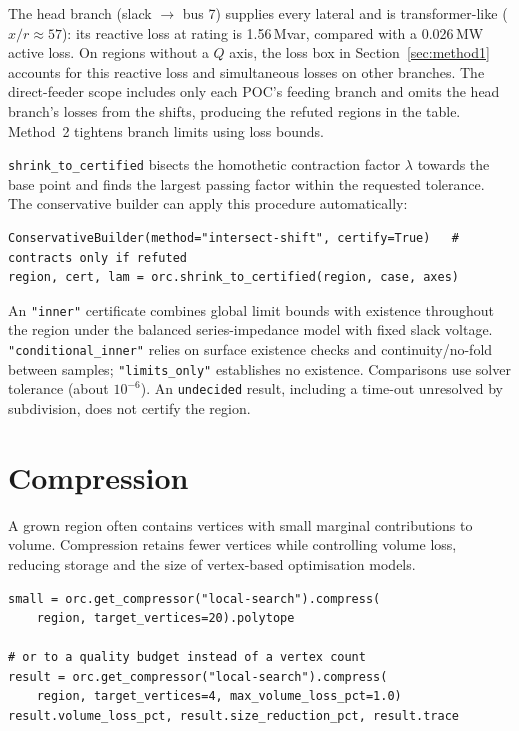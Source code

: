 \documentclass[11pt,a4paper]{report}
\newcommand{\why}[1]{\par\medskip\begingroup\noindent #1\par\endgroup\medskip}
\newcommand{\trap}[1]{\begin{warnbox}#1\end{warnbox}}
\newcommand{\code}[1]{\texttt{\small #1}}
\begin{document}
\why{The head branch (slack $\to$ bus 7) supplies every lateral and is
transformer-like ($x/r \approx 57$): its reactive loss at rating is
1.56\,Mvar, compared with a 0.026\,MW active loss. On regions without a $Q$
axis, the loss box in Section~\ref{sec:method1} accounts for this reactive loss
and simultaneous losses on other branches. The direct-feeder scope includes
only each POC's feeding branch and omits the head branch's losses from the
shifts, producing the refuted regions in the table. Method~2 tightens branch
limits using loss bounds.}

\code{shrink\_to\_certified} bisects the homothetic contraction factor
$\lambda$ towards the base point and finds the largest passing factor
within the requested tolerance. The conservative builder can apply this
procedure automatically:
\begin{lstlisting}
ConservativeBuilder(method="intersect-shift", certify=True)   # contracts only if refuted
region, cert, lam = orc.shrink_to_certified(region, case, axes)
\end{lstlisting}

\trap{An \code{"inner"} certificate combines global limit bounds with
existence throughout the region under the balanced series-impedance model
with fixed slack voltage. \code{"conditional\_inner"} relies on surface
existence checks and continuity/no-fold between samples;
\code{"limits\_only"} establishes no existence. Comparisons use solver
tolerance (about $10^{-6}$). An \code{undecided} result, including a time-out
unresolved by subdivision, does not certify the region.}

\chapter{Compression}
\label{ch:compression}

A grown region often contains vertices with small marginal contributions to
volume. Compression retains fewer vertices while controlling volume loss,
reducing storage and the size of vertex-based optimisation models.

\begin{lstlisting}
small = orc.get_compressor("local-search").compress(
    region, target_vertices=20).polytope

# or to a quality budget instead of a vertex count
result = orc.get_compressor("local-search").compress(
    region, target_vertices=4, max_volume_loss_pct=1.0)
result.volume_loss_pct, result.size_reduction_pct, result.trace
\end{lstlisting}
\end{document}
